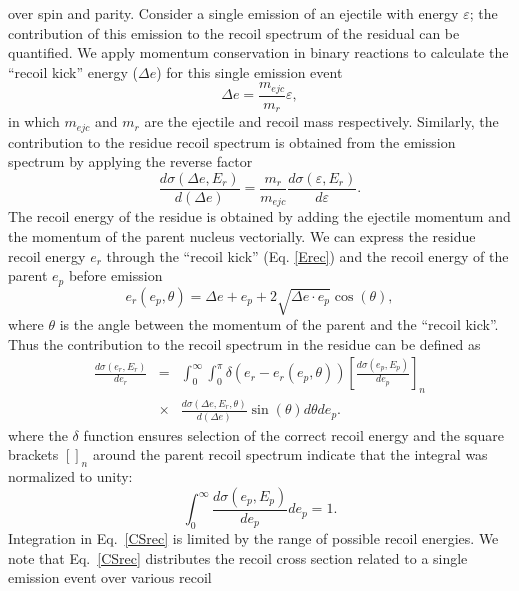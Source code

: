 \documentclass[twocolumn,amsmath,amssymb,10pt,groupedaddress,a4paper]{revtex4}
\begin{document}
over spin and parity. Consider a single emission of an ejectile with
energy $\varepsilon$; the contribution of this emission to the recoil
spectrum of the residual can be quantified. We apply momentum conservation
in binary reactions to calculate the {}``recoil kick'' energy ($\Delta e$)
for this single emission event
 \begin{equation}
\Delta e=\frac{m_{ejc}}{m_{r}}\varepsilon,
\label{Erec}
\end{equation}
in which $m_{ejc}$ and $m_{r}$ are the ejectile and recoil mass
respectively. Similarly, the contribution to the residue recoil spectrum
is obtained from the emission spectrum by applying the reverse factor
\begin{equation}
\frac{d\sigma(\Delta e,E_{r})}{d(\Delta e)}=\frac{m_{r}}{m_{ejc}}\frac{d\sigma(\varepsilon,E_{r})}{d\varepsilon}.
\label{CSkick}
\end{equation}
The recoil energy of the residue is obtained by adding the ejectile
momentum and the momentum of the parent nucleus vectorially. We can
express the residue recoil energy $e_{r}$ through the {}``recoil
kick'' (Eq. \ref{Erec}) and the recoil energy of the parent $e_{p}$
before emission
\begin{equation}
e_{r}(e_{p},\theta)=\Delta e+e_{p}+2\sqrt{\Delta e\cdot e_{p}}\cos(\theta),
\label{Eresrec}
\end{equation}
\noindent where $\theta$ is the angle between the momentum of the parent and
the {}``recoil kick''. Thus the contribution to the recoil spectrum
in the residue can be defined as
\begin{eqnarray}
\frac{d\sigma(e_{r},E_{r})}{de_{r}}&=&\int_{0}^{\infty}\int_{0}^{\pi}\delta\left(e_{r}-e_{r}(e_{p},\theta)\right)\left[\frac{d\sigma(e_{p},E_{p})}{de_{p}}\right]_{n}\nonumber\\
&\times&\frac{d\sigma(\Delta e,E_{r},\theta)}{d(\Delta e)}\sin(\theta)d\theta de_{p}.
\label{CSrec}
\end{eqnarray}
\noindent where the $\delta$ function ensures selection of the correct recoil
energy and the square brackets $\left[\right]_{n}$ around the parent
recoil spectrum indicate that the integral was normalized to unity:
\begin{equation}
\int_{0}^{\infty}\frac{d\sigma(e_{p},E_{p})}{de_{p}}de_{p}=1.
\end{equation}
Integration in Eq.~\ref{CSrec} is limited by the range of possible
recoil energies. We note that Eq.~\ref{CSrec} distributes the recoil
cross section related to a single emission event over various recoil
\end{document}
